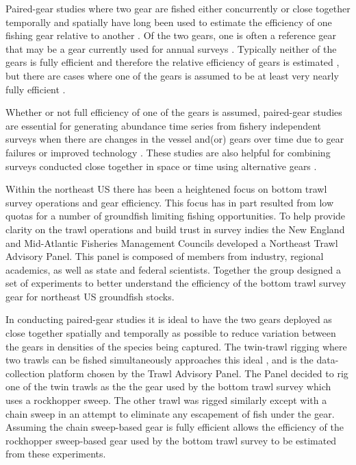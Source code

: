 \documentclass[
  12pt,
]{article}
\begin{document}
Paired-gear studies where two gear are fished either concurrently or
close together temporally and spatially have long been used to estimate
the efficiency of one fishing gear relative to another
\citep[e.g.,][]{gulland64,bourne65}. Of the two gears, one is often a
reference gear that may be a gear currently used for annual surveys
\citep[e.g.,][]{munrosomerton01}. Typically neither of the gears is
fully efficient and therefore the relative efficiency of gears is
estimated \citep[e.g.,][]{miller13,kotwickietal17}, but there are cases
where one of the gears is assumed to be at least very nearly fully
efficient \citep[e.g.,][]{somertonetal13, milleretal19}.

Whether or not full efficiency of one of the gears is assumed,
paired-gear studies are essential for generating abundance time series
from fishery independent surveys when there are changes in the vessel
and(or) gears over time due to gear failures or improved technology
\citep{pelletier98}. These studies are also helpful for combining
surveys conducted close together in space or time using alternative
gears \citep{kotwickietal13}.

Within the northeast US there has been a heightened focus on bottom
trawl survey operations and gear efficiency. This focus has in part
resulted from low quotas for a number of groundfish limiting fishing
opportunities. To help provide clarity on the trawl operations and build
trust in survey indies the New England and Mid-Atlantic Fisheries
Management Councils developed a Northeast Trawl Advisory Panel. This
panel is composed of members from industry, regional academics, as well
as state and federal scientists. Together the group designed a set of
experiments to better understand the efficiency of the bottom trawl
survey gear for northeast US groundfish stocks.

In conducting paired-gear studies it is ideal to have the two gears
deployed as close together spatially and temporally as possible to
reduce variation between the gears in densities of the species being
captured. The twin-trawl rigging \citep{kragetal15} where two trawls can
be fished simultaneously approaches this ideal \citep{ices96}, and is
the data-collection platform chosen by the Trawl Advisory Panel. The
Panel decided to rig one of the twin trawls as the the gear used by the
bottom trawl survey which uses a rockhopper sweep. The other trawl was
rigged similarly except with a chain sweep in an attempt to eliminate
any escapement of fish under the gear. Assuming the chain sweep-based
gear is fully efficient allows the efficiency of the rockhopper
sweep-based gear used by the bottom trawl survey to be estimated from
these experiments.
\end{document}
